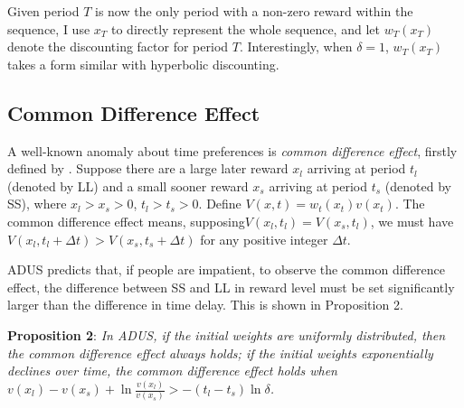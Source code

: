 \documentclass[
  12pt,
]{article}
\begin{document}
Given period \(T\) is now the only period with a non-zero reward within
the sequence, I use \(x_T\) to directly represent the whole sequence,
and let \(w_T(x_T)\) denote the discounting factor for period \(T\).
Interestingly, when \(\delta=1\), \(w_T(x_T)\) takes a form similar with
hyperbolic discounting.

\hypertarget{common-difference-effect}{%
\subsection{Common Difference Effect}\label{common-difference-effect}}

A well-known anomaly about time preferences is \emph{common difference
effect}, firstly defined by \citet{loewenstein_anomalies_1992}. Suppose
there are a large later reward \(x_l\) arriving at period \(t_l\)
(denoted by LL) and a small sooner reward \(x_s\) arriving at period
\(t_s\) (denoted by SS), where \(x_l>x_s>0\), \(t_l>t_s>0\). Define
\(V(x,t)=w_t(x_t)v(x_t)\). The common difference effect means,
supposing\(V(x_l,t_l)=V(x_s,t_l)\), we must have
\(V(x_l,t_l+\Delta t)>V(x_s,t_s+\Delta t)\) for any positive integer
\(\Delta t\).

ADUS predicts that, if people are impatient, to observe the common
difference effect, the difference between SS and LL in reward level must
be set significantly larger than the difference in time delay. This is
shown in Proposition 2.

\textbf{Proposition 2}: \emph{In ADUS, if the initial weights are
uniformly distributed, then the common difference effect always holds;
if the initial weights exponentially declines over time, the common
difference effect holds when}
\(v(x_l)-v(x_s)+\ln\frac{v(x_l)}{v(x_s)}>-(t_l-t_s)\ln\delta\)\emph{.}
\end{document}
